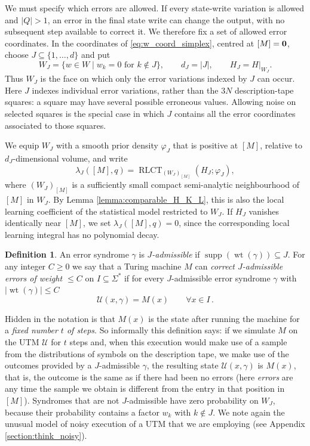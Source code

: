 \documentclass[english,letter paper,12pt,reqno]{article}
\theoremstyle{definition}
\newtheorem{definition}[theorem]{Definition}
\def\be{\begin{equation}}
\def\ee{\end{equation}}
\begin{document}
We must specify which errors are allowed. If every state-write variation is allowed and $|Q|>1$, an error in the final state write can change the output, with no subsequent step available to correct it. We therefore fix a set of allowed error coordinates. In the coordinates of \eqref{eq:w_coord_simplex}, centred at $[M]=\bold{0}$, choose $J \subseteq \{1,\ldots,d\}$ and put
\[
W_J = \{w \in W \mid w_k=0 \text{ for } k\notin J\},\qquad d_J=|J|,\qquad H_J=H|_{W_J}.
\]
Thus $W_J$ is the face on which only the error variations indexed by $J$ can occur. Here $J$ indexes individual error variations, rather than the $3N$ description-tape squares: a square may have several possible erroneous values. Allowing noise on selected squares is the special case in which $J$ contains all the error coordinates associated to those squares.

We equip $W_J$ with a smooth prior density $\varphi_J$ that is positive at $[M]$, relative to $d_J$-dimensional volume, and write
\[
\lambda_J([M],q) = \operatorname{RLCT}_{(W_J)_{[M]}}(H_J;\varphi_J),
\]
where $(W_J)_{[M]}$ is a sufficiently small compact semi-analytic neighbourhood of $[M]$ in $W_J$. By Lemma \ref{lemma:comparable_H_K_L}, this is also the local learning coefficient of the statistical model restricted to $W_J$. If $H_J$ vanishes identically near $[M]$, we set $\lambda_J([M],q)=0$, since the corresponding local learning integral has no polynomial decay.

\begin{definition}\label{defn:J_error_correction} An error syndrome $\gamma$ is \emph{$J$-admissible} if $\operatorname{supp}(\operatorname{wt}(\gamma))\subseteq J$. For any integer $C \ge 0$ we say that a Turing machine $M$ can \emph{correct $J$-admissible errors of weight $\le C$} on $I \subseteq \Sigma^*$ if for every $J$-admissible error syndrome $\gamma$ with $|\operatorname{wt}(\gamma)| \le C$
\be
\mathcal{U}(x, \gamma) = M(x) \qquad \forall x \in I\,.
\ee
\end{definition}

Hidden in the notation is that $M(x)$ is the state after running the machine for a \emph{fixed number $t$ of steps}. So informally this definition says: if we simulate $M$ on the UTM $\mathcal{U}$ for $t$ steps and, when this execution would make use of a sample from the distributions of symbols on the description tape, we make use of the outcomes provided by a $J$-admissible $\gamma$, the resulting state $\mathcal{U}(x,\gamma)$ is $M(x)$, that is, the outcome is the same as if there had been no errors (here \emph{errors} are any time the sample we obtain is different from the entry in that position in $[M]$). Syndromes that are not $J$-admissible have zero probability on $W_J$, because their probability contains a factor $w_k$ with $k\notin J$. We note again the unusual model of noisy execution of a UTM that we are employing (see Appendix \ref{section:think_noisy}).
\end{document}

